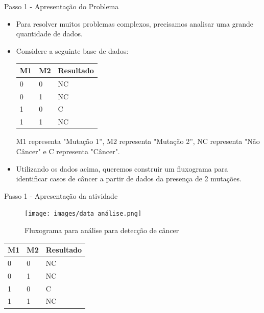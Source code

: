 \documentclass{beamer}
\begin{document}
\begin{frame}{Passo 1 - Apresentação do Problema}

\begin{itemize}
   
\item <1->Para resolver muitos problemas complexos, precisamos analisar uma grande quantidade de dados. 



\item <2->Considere a seguinte base de dados:

\begin{center}
\begin{tabular}{|l|l|l|}
\hline
M1 & M2 & Resultado\\
\hline
0  & 0 & NC\\
\hline
0  & 1 & NC\\
\hline
1  & 0 & C\\
\hline
1  & 1 & NC\\
\hline
\end{tabular}
\end{center}

M1 representa "Mutação 1'', M2 representa "Mutação 2'', NC representa "Não Câncer" e C representa "Câncer".

\item <3->Utilizando os dados acima, queremos construir um fluxograma para identificar casos de câncer a partir de dados da presença de 2 mutações.

\end{itemize}

\end{frame}


\begin{frame}{Passo 1 - Apresentação da atividade}


\begin{multicols}{2}

\begin{figure}
\begin{center}
	\texttt{[image: images/data análise.png]} 
\end{center}
\caption{Fluxograma para análise para detecção de câncer}
\end{figure}

\columnbreak

\begin{tabular}{|l|l|l|}
\hline
M1 & M2 & Resultado\\
\hline
0  & 0 & NC\\
\hline
0  & 1 & NC\\
\hline
1  & 0 & C\\
\hline
1  & 1 & NC\\
\hline
\end{tabular}





\end{multicols}


 
\end{frame}
\end{document}
